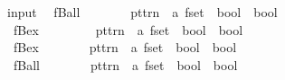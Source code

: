 \begin{isabellebody}
\isanewline
{}\isamarkupfalse%
\ {\isacharparenleft}input{\isacharparenright}\isanewline
\ \ {\isachardoublequoteopen}{\isacharunderscore}fBall{\isachardoublequoteclose}\ \ \ \ \ \ \ {\isacharcolon}{\isacharcolon}\ {\isachardoublequoteopen}pttrn\ {\isasymRightarrow}\ {\isacharprime}a\ fset\ {\isasymRightarrow}\ bool\ {\isasymRightarrow}\ bool{\isachardoublequoteclose}\ \ \ \ \ \ {\isacharparenleft}{\isachardoublequoteopen}{\isacharparenleft}{}{\isacharbang}\ {\isacharparenleft}{\isacharunderscore}{\isacharslash}{\isacharcolon}{\isacharunderscore}{\isacharparenright}{\isachardot}{\isacharslash}\ {\isacharunderscore}{\isacharparenright}{\isachardoublequoteclose}\ {\isacharbrackleft}{}{\isacharcomma}\ {}{\isacharcomma}\ {}{}{\isacharbrackright}\ {}{}{\isacharparenright}\isanewline
\ \ {\isachardoublequoteopen}{\isacharunderscore}fBex{\isachardoublequoteclose}\ \ \ \ \ \ \ \ {\isacharcolon}{\isacharcolon}\ {\isachardoublequoteopen}pttrn\ {\isasymRightarrow}\ {\isacharprime}a\ fset\ {\isasymRightarrow}\ bool\ {\isasymRightarrow}\ bool{\isachardoublequoteclose}\ \ \ \ \ \ {\isacharparenleft}{\isachardoublequoteopen}{\isacharparenleft}{}{\isacharquery}\ {\isacharparenleft}{\isacharunderscore}{\isacharslash}{\isacharcolon}{\isacharunderscore}{\isacharparenright}{\isachardot}{\isacharslash}\ {\isacharunderscore}{\isacharparenright}{\isachardoublequoteclose}\ {\isacharbrackleft}{}{\isacharcomma}\ {}{\isacharcomma}\ {}{}{\isacharbrackright}\ {}{}{\isacharparenright}\isanewline
\ \ {\isachardoublequoteopen}{\isacharunderscore}fBex{}{\isachardoublequoteclose}\ \ \ \ \ \ \ {\isacharcolon}{\isacharcolon}\ {\isachardoublequoteopen}pttrn\ {\isasymRightarrow}\ {\isacharprime}a\ fset\ {\isasymRightarrow}\ bool\ {\isasymRightarrow}\ bool{\isachardoublequoteclose}\ \ \ \ \ \ {\isacharparenleft}{\isachardoublequoteopen}{\isacharparenleft}{}{\isacharquery}{\isacharbang}\ {\isacharparenleft}{\isacharunderscore}{\isacharslash}{\isacharcolon}{\isacharunderscore}{\isacharparenright}{\isachardot}{\isacharslash}\ {\isacharunderscore}{\isacharparenright}{\isachardoublequoteclose}\ {\isacharbrackleft}{}{\isacharcomma}\ {}{\isacharcomma}\ {}{}{\isacharbrackright}\ {}{}{\isacharparenright}\isanewline
\isanewline
{}\isamarkupfalse%
\isanewline
\ \ {\isachardoublequoteopen}{\isacharunderscore}fBall{\isachardoublequoteclose}\ \ \ \ \ \ \ {\isacharcolon}{\isacharcolon}\ {\isachardoublequoteopen}pttrn\ {\isasymRightarrow}\ {\isacharprime}a\ fset\ {\isasymRightarrow}\ bool\ {\isasymRightarrow}\ bool{\isachardoublequoteclose}\ \ \ \ \ \ {\isacharparenleft}{\isachardoublequoteopen}{\isacharparenleft}{}{\isasymforall}{\isacharparenleft}{\isacharunderscore}{\isacharslash}{\isacharbar}{\isasymin}{\isacharbar}{\isacharunderscore}{\isacharparenright}{\isachardot}{\isacharslash}\ {\isacharunderscore}{\isacharparenright}{\isachardoublequoteclose}\ {\isacharbrackleft}{}{\isacharcomma}\ {}{\isacharcomma}\ {}{}{\isacharbrackright}\ {}{}{\isacharparenright}\isanewline

\end{isabellebody}
